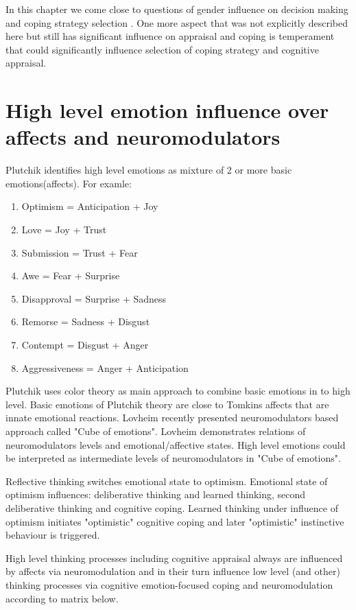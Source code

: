 In this chapter we come close to questions of gender influence on decision making and coping strategy selection \cite{sex_differencies}. One more aspect that was not explicitly described here but still has significant influence on appraisal and coping is temperament that could significantly influence selection of coping strategy and cognitive appraisal.

\section{High level emotion influence over affects and neuromodulators}

Plutchik identifies high level emotions \cite{natureofemotions} as mixture of 2 or more basic emotions(affects). For examle:

\begin{enumerate}
	\item  Optimism =	Anticipation + Joy
	\item  Love =	Joy + Trust
	\item  Submission = Trust + Fear
	\item  Awe = Fear + Surprise
	\item  Disapproval = Surprise + Sadness
	\item  Remorse = Sadness + Disgust
	\item  Contempt = Disgust + Anger
	\item  Aggressiveness =	Anger + Anticipation
\end{enumerate}

Plutchik uses color theory as main approach to combine basic emotions in to high level. Basic emotions of Plutchik theory are close to Tomkins affects that are innate emotional reactions. Lovheim recently presented neuromodulators based approach called "Cube of emotions"\cite{cubeofemotions}. Lovheim demonstrates relations of neuromodulators levels and emotional/affective states. High level emotions could be interpreted as intermediate levels of neuromodulators in "Cube of emotions"\cite{cubeofemotions}.



Reflective thinking switches emotional state to optimism. Emotional state of optimism influences: deliberative thinking and learned thinking, second deliberative thinking and cognitive coping. Learned thinking under influence of optimism initiates "optimistic" cognitive coping and later "optimistic" instinctive behaviour is triggered.

High level thinking processes including cognitive appraisal always are influenced by affects via neuromodulation and in their turn influence low level (and other) thinking processes via cognitive emotion-focused coping and neuromodulation according to matrix below.

